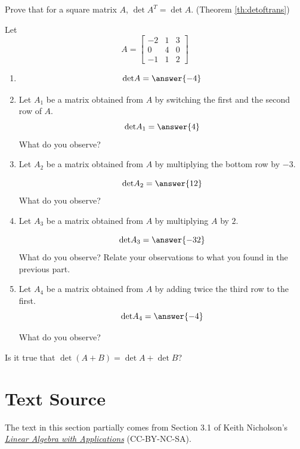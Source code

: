 \documentclass{ximera}
\begin{document}

\begin{problem}\label{prob:detOfTrans}
    Prove that for a square matrix $A$, $\det{A^T}=\det{A}$. (Theorem \ref{th:detoftrans})
\end{problem}

\begin{problem}\label{prob:detrowswitch}
Let $$A=\begin{bmatrix}-2&1&3\\0&4&0\\-1&1&2\end{bmatrix}$$

\begin{enumerate}
    \item $$\text{det}A=\answer{-4}$$
    \item Let $A_1$ be a matrix obtained from $A$ by switching the first and the second row of $A$.  
$$\text{det}A_1=\answer{4}$$
    What do you observe?

    \item Let $A_2$ be a matrix obtained from $A$ by multiplying the bottom row by $-3$.

 $$\text{det}A_2=\answer{12}$$   
    What do you observe?

    \item Let $A_3$ be a matrix obtained from $A$  by multiplying $A$ by $2$.    
    
    $$\text{det}A_3=\answer{-32}$$ 
    What do you observe?  Relate your observations to what you found in the previous part.

    \item Let $A_4$ be a matrix obtained from $A$ by adding twice the third row to the first.  
    $$\text{det}A_4=\answer{-4}$$ 
    
    What do you observe?
\end{enumerate}
\end{problem}

\begin{problem}\label{prob:detsumsumdetquestion}
Is it true that 
$\det{(A+B)}=\det{A}+\det{B}$?
\end{problem}

\section*{Text Source}
The text in this section partially comes from Section 3.1  of Keith Nicholson's \href{https://open.umn.edu/opentextbooks/textbooks/linear-algebra-with-applications}{\it Linear Algebra with Applications} (CC-BY-NC-SA).
\end{document}
